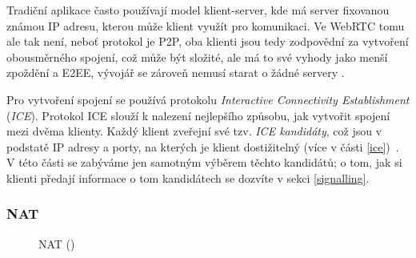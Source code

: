 Tradiční aplikace často používají model klient-server, kde má server fixovanou
známou IP adresu, kterou může klient využít pro komunikaci. Ve WebRTC tomu ale
tak není, neboť protokol je P2P, oba klienti jsou tedy zodpovědní za vytvoření
obousměrného spojení, což může být složité, ale má to své vyhody jako menší
zpoždění a E2EE, vývojář se zároveň nemusí starat o žádné servery
\cite{WebRTCForTheCurious}.

Pro vytvoření spojení se používá protokolu \textit{Interactive Connectivity
Establishment} (\textit{ICE}). Protokol ICE slouží k nalezení nejlepšího
způsobu, jak vytvořit spojení mezi dvěma klienty. Každý klient zveřejní své tzv.
\textit{ICE kandidáty}, což jsou v podstatě IP adresy a porty, na kterých je
klient dostižitelný (více v části \ref{ice})~\cite{WebRTCForTheCurious}. V této
části se zabýváme jen samotným výběrem těchto kandidátů; o tom, jak si klienti
předají informace o tom kandidátech se dozvíte v sekci \ref{signalling}.

\subsubsection{NAT}\label{nat}

\begin{figure}[H]
	\centering
	\caption{NAT (\publicPrivateIP)}
	\label{natFig}
\end{figure}

